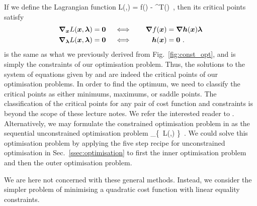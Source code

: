 If we define the Lagrangian function
\bmath
  L(,\vect{\lambda}) = f() - \vect{\lambda}^T()\ ,
\emath
then its critical points satisfy
\begin{alignat}{2}
  \vect{\nabla}_{\vect{x}} L(\vect{x},\vect{\lambda}) &= \vect{0}\quad\iff&\quad\vect{\nabla}f(\vect{x}) &= \vect{\nabla}\vect{h}(\vect{x})\vect{\lambda}\label{eq:grad_lagr_func}\\
  \vect{\nabla}_{\vect{\lambda}} L(\vect{x},\vect{\lambda}) &= \vect{0}\quad\iff&\quad\vect{h}(\vect{x}) &= \vect{0}\ .\label{eq:grad_lagr_func_const}
\end{alignat}
 is the same as what we previously derived from Fig.~\ref{fig:const_opt}, and  is simply the constraints of our optimisation problem. Thus, the solutions to the system of equations given by  and  are indeed the critical points of our optimisation problems. In order to find the optimum, we need to classify the critical points as either minimums, maximums, or saddle points. The classification of the critical points for any pair of cost function and constraints is beyond the scope of these lecture notes. We refer the interested reader to \cite[pp.~294--308]{Antoniou2007}. Alternatively, we may formulate the constrained optimisation problem in  as the sequential unconstrained optimisation problem \cite[ch.~5]{Boyd2004}
\bmath
  \max_{\vect{\lambda}}\left\{\ L(,\vect{\lambda}) \right\}\ .
  \label{eq:constr_opt_nested}
\emath
We could solve this optimisation problem by applying the five step recipe for unconstrained optimisation in Sec.~\ref{ssec:optimisation} to first the inner optimisation problem and then the outer optimisation problem.

We are here not concerned with these general methods. Instead, we consider the simpler problem of minimising a quadratic cost function with linear equality constraints.

